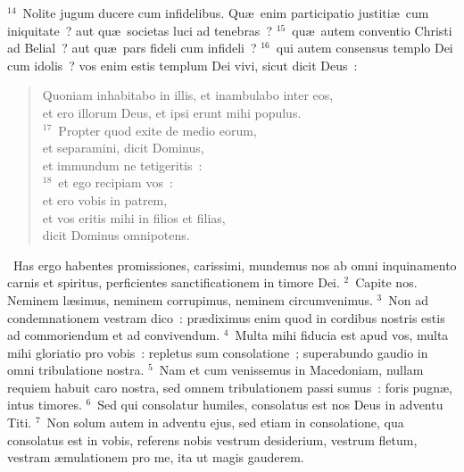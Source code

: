 ${}^{14}$~Nolite jugum ducere cum infidelibus. Qu\ae\ enim participatio justiti\ae\ cum iniquitate~? aut qu\ae\ societas luci ad tenebras~?
${}^{15}$~qu\ae\ autem conventio Christi ad Belial~? aut qu\ae\ pars fideli cum infideli~?
${}^{16}$~qui autem consensus templo Dei cum idolis~? vos enim estis templum Dei vivi, sicut dicit Deus~: \begin{flushleft}\begin{verse}Quoniam inhabitabo in illis, et inambulabo inter eos,\\ et ero illorum Deus, et ipsi erunt mihi populus.\\
${}^{17}$~Propter quod exite de medio eorum,\\ et separamini, dicit Dominus,\\ et immundum ne tetigeritis~:\\
${}^{18}$~et ego recipiam vos~:\\ et ero vobis in patrem,\\ et vos eritis mihi in filios et filias,\\ dicit Dominus omnipotens.\end{verse}\end{flushleft}


~\lettrine[lines=10,image=true,loversize=0.05,lraise=-0.03]{H}{}as ergo habentes promissiones, carissimi, mundemus nos ab omni inquinamento carnis et spiritus, perficientes sanctificationem in timore Dei.
${}^{2}$~Capite nos. Neminem l\ae simus, neminem corrupimus, neminem circumvenimus.
${}^{3}$~Non ad condemnationem vestram dico~: pr\ae diximus enim quod in cordibus nostris estis ad commoriendum et ad convivendum.
${}^{4}$~Multa mihi fiducia est apud vos, multa mihi gloriatio pro vobis~: repletus sum consolatione~; superabundo gaudio in omni tribulatione nostra.
${}^{5}$~Nam et cum venissemus in Macedoniam, nullam requiem habuit caro nostra, sed omnem tribulationem passi sumus~: foris pugn\ae , intus timores.
${}^{6}$~Sed qui consolatur humiles, consolatus est nos Deus in adventu Titi.
${}^{7}$~Non solum autem in adventu ejus, sed etiam in consolatione, qua consolatus est in vobis, referens nobis vestrum desiderium, vestrum fletum, vestram \ae mulationem pro me, ita ut magis gauderem.


